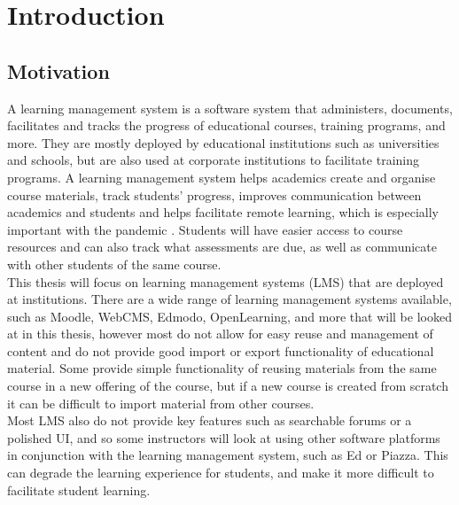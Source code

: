 \chapter{Introduction}\label{ch:intro}

\section{Motivation}
A learning management system is a software system that administers, documents, facilitates and tracks the progress of educational courses, training programs, and more. They are mostly deployed by educational institutions such as universities and schools, but are also used at corporate institutions to facilitate training programs\cite{lmsdefinition}. A learning management system helps academics create and organise course materials, track students' progress, improves communication between academics and students and helps facilitate remote learning, which is especially important with the pandemic \cite{lmsreasons}. Students will have easier access to course resources and can also track what assessments are due, as well as communicate with other students of the same course.\\

This thesis will focus on learning management systems (LMS) that are deployed at institutions. There are a wide range of learning management systems available, such as Moodle, WebCMS, Edmodo, OpenLearning, and more that will be looked at in this thesis, however most do not allow for easy reuse and management of content and do not provide good import or export functionality of educational material. Some provide simple functionality of reusing materials from the same course in a new offering of the course, but if a new course is created from scratch it can be difficult to import material from other courses.\\

Most LMS also do not provide key features such as searchable forums or a polished UI, and so some instructors will look at using other software platforms in conjunction with the learning management system, such as Ed or Piazza. This can degrade the learning experience for students, and make it more difficult to facilitate student learning.\\

